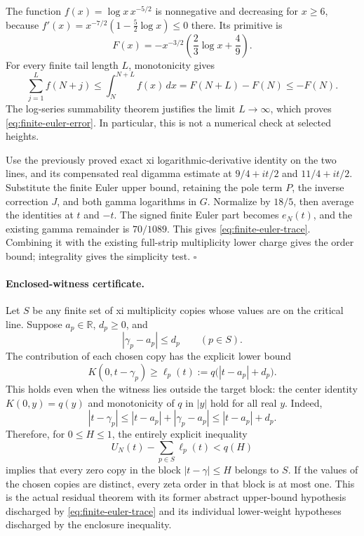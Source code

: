 The function \(f(x)=\log x\,x^{-5/2}\) is nonnegative and decreasing for
\(x\ge6\), because
\(f'(x)=x^{-7/2}(1-\frac52\log x)\le0\) there.  Its primitive is
\[
 F(x)=-x^{-3/2}\left(\frac23\log x+\frac49\right).
\]
For every finite tail length \(L\), monotonicity gives
\[
 \sum_{j=1}^{L}f(N+j)
 \le\int_N^{N+L}f(x)\,dx
 =F(N+L)-F(N)\le-F(N).
\]
The log-series summability theorem justifies the limit \(L\to\infty\),
which proves \eqref{eq:finite-euler-error}.  In particular, this is not
a numerical check at selected heights.

Use the previously proved exact xi logarithmic-derivative identity on the
two lines, and its compensated real digamma estimate at
\(9/4+it/2\) and \(11/4+it/2\).  Substitute the finite Euler upper bound,
retaining the pole term \(P\), the inverse correction \(J\), and both
gamma logarithms in \(G\).  Normalize by \(18/5\), then average the
identities at \(t\) and \(-t\).  The signed finite Euler part becomes
\(e_N(t)\), and the existing gamma remainder is \(70/1089\).
This gives \eqref{eq:finite-euler-trace}.  Combining it with the existing
full-strip multiplicity lower charge gives the order bound; integrality
gives the simplicity test. \(\square\)

\paragraph{Enclosed-witness certificate.}
Let \(S\) be any finite set of xi multiplicity copies whose values are on
the critical line.  Suppose \(a_p\in\mathbb R\), \(d_p\ge0\), and
\[
 |\gamma_p-a_p|\le d_p\qquad(p\in S).
\]
The contribution of each chosen copy has the explicit lower bound
\[
 K(0,t-\gamma_p)\ge
 \ell_p(t):=q\bigl(|t-a_p|+d_p\bigr).
\]
This holds even when the witness lies outside the target block:
the center identity \(K(0,y)=q(y)\) and monotonicity of \(q\) in
\(|y|\) hold for all real \(y\).  Indeed,
\[
 |t-\gamma_p|\le |t-a_p|+|\gamma_p-a_p|\le |t-a_p|+d_p.
\]
Therefore, for \(0\le H\le1\), the entirely explicit inequality
\begin{equation}
 U_N(t)-\sum_{p\in S}\ell_p(t)<q(H)
 \label{eq:finite-euler-enclosed-budget}
\end{equation}
implies that every zero copy in the block \(|t-\gamma|\le H\) belongs
to \(S\).  If the values of the chosen copies are distinct, every zeta
order in that block is at most one.  This is the actual residual theorem
with its former abstract upper-bound hypothesis discharged by
\eqref{eq:finite-euler-trace} and its individual lower-weight hypotheses
discharged by the enclosure inequality.

